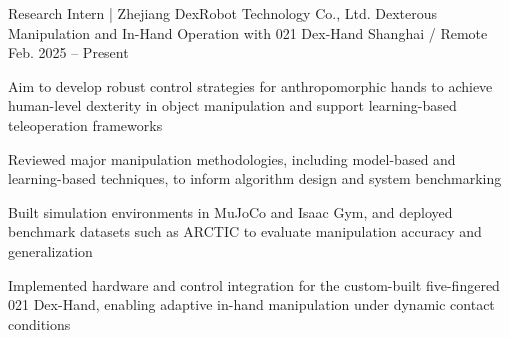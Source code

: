 \begin{cventries}
    \vspace{4.5mm}
    \cventry
      {Research Intern | Zhejiang DexRobot Technology Co., Ltd.} %
      {Dexterous Manipulation and In-Hand Operation with 021 Dex-Hand} %
      {Shanghai / Remote} %
      {Feb. 2025 -- Present} %
      {
        Aim to develop robust control strategies for anthropomorphic hands to achieve human-level dexterity in object manipulation and support learning-based teleoperation frameworks
        \vspace{4.5mm}
        \begin{cvitems} 
          \item{Reviewed major manipulation methodologies, including model-based and learning-based techniques, to inform algorithm design and system benchmarking}     
          \item{Built simulation environments in MuJoCo and Isaac Gym, and deployed benchmark datasets such as ARCTIC to evaluate manipulation accuracy and generalization} 
          \item{Implemented hardware and control integration for the custom-built five-fingered 021 Dex-Hand, enabling adaptive in-hand manipulation under dynamic contact conditions} 
        \end{cvitems}
        \vspace{4.5mm}
      }
    


\end{cventries}
